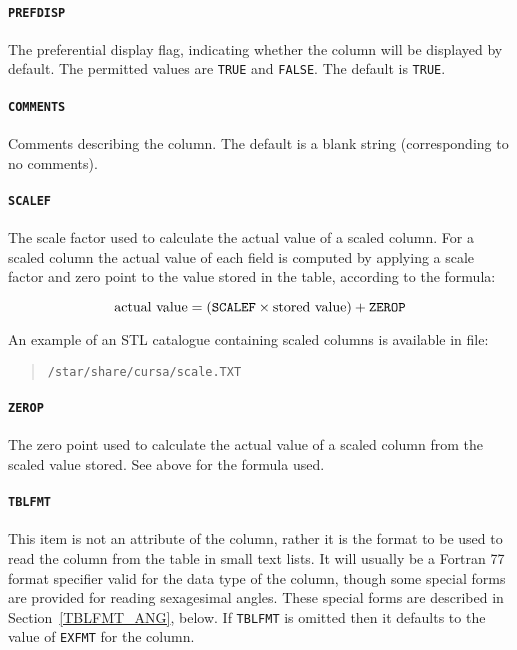 \documentclass[twoside,11pt]{article}
\renewcommand{\_}{\texttt{\symbol{95}}}
\begin{document}
\paragraph{{\tt PREFDISP}}  The preferential display flag, indicating
whether the column will be displayed by default.
The permitted values are {\tt TRUE} and {\tt FALSE}.
The default is {\tt TRUE}.

\paragraph{{\tt COMMENTS}}  Comments describing the column.  The default
is a blank string (corresponding to no comments).

\paragraph{{\tt SCALEF}} The scale factor used to calculate the actual
value of a scaled column.  For a scaled column the actual value of each
field is computed by applying a scale factor and zero point to the value
stored in the table, according to the formula:

\begin{equation}
{\rm actual~value} = 
                ( {\tt SCALEF} \times {\rm stored~value} ) + {\tt ZEROP}
\end{equation}

An example of an STL catalogue containing scaled columns is available in
file:

\begin{verse}
{\tt /star/share/cursa/scale.TXT}
\end{verse}

\paragraph{{\tt ZEROP}} The zero point used to calculate the actual value
of a scaled column from the scaled value stored. See above for the
formula used.

\paragraph{{\tt TBLFMT}} This item is not an attribute of the column,
rather it is the format to be used to read the column from the table 
in small text lists.  It will usually be a Fortran 77 format specifier
valid for the data type of the column, though some special forms are
provided for reading sexagesimal angles.  These special forms are
described in Section~\ref{TBLFMT_ANG}, below.  If {\tt TBLFMT} is
omitted then it defaults to the value of {\tt EXFMT} for the column.
\end{document}
